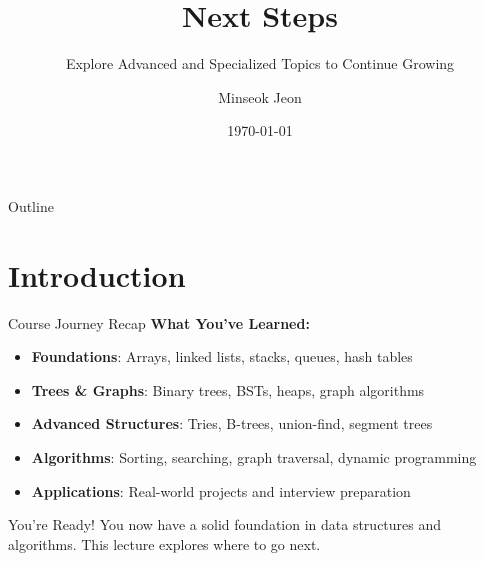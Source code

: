 \documentclass[aspectratio=169,xcolor=dvipsnames]{beamer}
\title{Next Steps}
\subtitle{Explore Advanced and Specialized Topics to Continue Growing}
\author{Minseok Jeon}
\institute{DGIST}
\date{\today}
\begin{document}
\begin{frame}
  \titlepage
\end{frame}

\begin{frame}{Outline}
  \tableofcontents
\end{frame}

\section{Introduction}

\begin{frame}{Course Journey Recap}
  \textbf{What You've Learned:}
  \begin{itemize}
    \item \textbf{Foundations}: Arrays, linked lists, stacks, queues, hash tables
    \item \textbf{Trees \& Graphs}: Binary trees, BSTs, heaps, graph algorithms
    \item \textbf{Advanced Structures}: Tries, B-trees, union-find, segment trees
    \item \textbf{Algorithms}: Sorting, searching, graph traversal, dynamic programming
    \item \textbf{Applications}: Real-world projects and interview preparation
  \end{itemize}

  \vspace{0.3cm}
  \begin{block}{You're Ready!}
    You now have a solid foundation in data structures and algorithms. This lecture explores where to go next.
  \end{block}
\end{frame}
\end{document}
